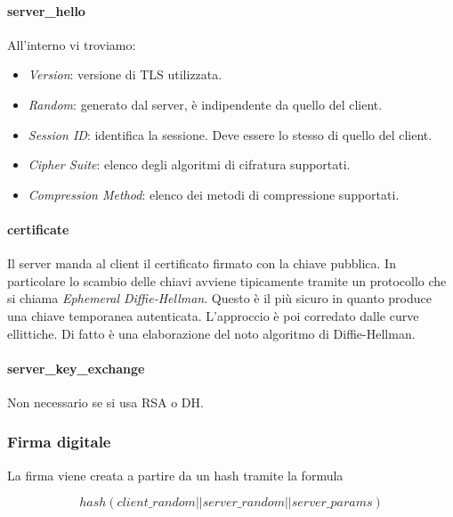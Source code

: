 \documentclass[14pt]{extreport}
\begin{document}
\paragraph{server\_hello}
All'interno vi troviamo:


\begin{itemize}


    \item \textit{Version}: versione di TLS utilizzata.
    \item \textit{Random}: generato dal server, è indipendente da quello del client.
    
    
    \item \textit{Session ID}: identifica la sessione. Deve essere lo stesso di quello del client.
    
    
    \item \textit{Cipher Suite}: elenco degli algoritmi di cifratura supportati.
    
    \item \textit{Compression Method}: elenco dei metodi di compressione supportati.
\end{itemize}




\paragraph{certificate}

Il server manda al client il certificato firmato con la chiave pubblica. In particolare lo scambio delle chiavi avviene tipicamente tramite un protocollo che si chiama \textit{Ephemeral Diffie-Hellman}. Questo è il più sicuro in quanto produce una chiave temporanea autenticata. L'approccio è poi corredato dalle curve ellittiche. Di fatto è una elaborazione del noto algoritmo di Diffie-Hellman.



\paragraph{server\_key\_exchange}
Non necessario se si usa RSA o DH.


\subsubsection{Firma digitale}
La firma viene creata a partire da un hash tramite la formula


$$
hash(client\_random || server\_random || server\_params)
$$
\end{document}
